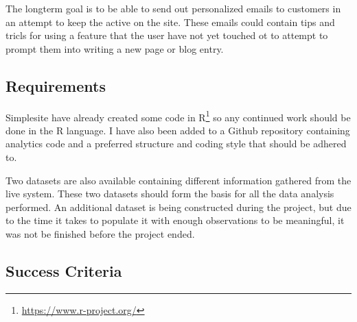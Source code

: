 The longterm goal is to be able to send out personalized emails to customers in
an attempt to keep the active on the site. These emails could contain tips and
tricls for using a feature that the user have not yet touched ot to attempt to
prompt them into writing a new page or blog entry.




\subsection{Requirements}

Simplesite have already created some code in
R\footnote{\url{https://www.r-project.org/}} so any continued work should be
done in the R language. I have also been added to a Github repository containing
analytics code and a preferred structure and coding style that should be adhered
to.

Two datasets are also available containing different information gathered from
the live system. These two datasets should form the basis for all the
data analysis performed. An additional dataset is being constructed during the
project, but due to the time it takes to populate it with enough observations to
be meaningful, it was not be finished before the project ended.


\subsection{Success Criteria}
\label{sec:success}

